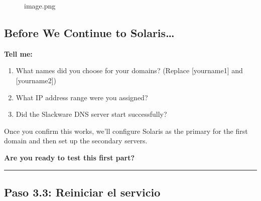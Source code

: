 \begin{figure}
\centering
{}
\caption{image.png}
\end{figure}

\subsection{Before We Continue to
Solaris\ldots{}}\label{before-we-continue-to-solaris}

\textbf{Tell me:}

\begin{enumerate}
\def\labelenumi{\arabic{enumi}.}
\tightlist
\item
  What names did you choose for your domains? (Replace {[}yourname1{]}
  and {[}yourname2{]})
\item
  What IP address range were you assigned?
\item
  Did the Slackware DNS server start successfully?
\end{enumerate}

Once you confirm this works, we'll configure Solaris as the primary for
the first domain and then set up the secondary servers.

\textbf{Are you ready to test this first part?}

\begin{center}\rule{0.5\linewidth}{0.5pt}\end{center}

\subsection{Paso 3.3: Reiniciar el
servicio}\label{paso-3.3-reiniciar-el-servicio}

